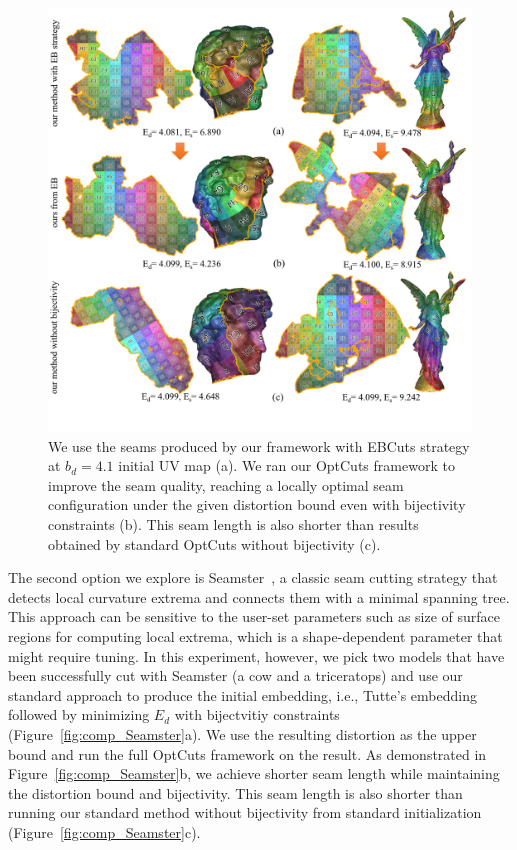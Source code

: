 \begin{figure}[t]
\centering
\includegraphics[width=\linewidth]{fig/comp_GI_outputAsInit.png}
\caption{We use the seams produced by our framework with EBCuts strategy at $b_d = 4.1$  initial UV map (a). We ran our OptCuts framework to improve the seam quality, reaching a locally optimal seam configuration under the given distortion bound even with bijectivity constraints (b). This seam length is also shorter than results obtained by standard OptCuts without bijectivity (c).}
\label{fig:comp_GI_outputAsInit}
\end{figure}

The second option we explore is Seamster~\cite{Sheffer2002Seamster}, a classic seam cutting strategy that detects local curvature extrema and connects them with a minimal spanning tree.  This approach can be sensitive to the user-set parameters such as size of surface regions for computing local extrema, which is a shape-dependent parameter that might require tuning. In this experiment, however, we pick two models that have been successfully cut with Seamster (a cow and a triceratops) and use our standard approach to produce the initial embedding, i.e., Tutte's embedding followed by minimizing $E_{d}$ with bijectvitiy constraints (Figure~\ref{fig:comp_Seamster}a). We use the resulting distortion as the upper bound and run the full OptCuts framework on the result. As demonstrated in Figure~\ref{fig:comp_Seamster}b, we achieve shorter seam length while maintaining the distortion bound and bijectivity. This seam length is also shorter than running our standard method without bijectivity from standard initialization (Figure~\ref{fig:comp_Seamster}c).

